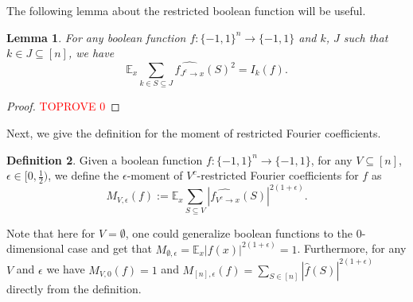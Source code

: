 \documentclass[10pt]{article} \usepackage[utf8]{inputenc}
\newtheorem{lem}{Lemma}[section]
\theoremstyle{definition}
\newtheorem{defn}[lem]{Definition}
\theoremstyle{remark}
\numberwithin{equation}{section}
\begin{document}
The following lemma about the restricted boolean function will be useful.
\begin{lem}
\label{L22}
For any boolean function $f:\{-1,1\}^n \to \{-1,1\}$ and $k$, $J$ such that $k\in J \subseteq [n]$, we have
\begin{equation}
\mathbb{E}_x \sum_{k\in S\subseteq J} \widehat{f_{J^c \to x}}(S)^2 =I_k(f).
\end{equation}
\end{lem}
\begin{proof}\textcolor{red}{TOPROVE 0}\end{proof}

Next, we give the definition for the moment of restricted Fourier coefficients.
\begin{defn}
Given a boolean function $f:\{-1,1\}^n\to \{-1,1\}$, for any $V \subseteq [n]$, $\epsilon \in [0, \frac{1}{2})$, we define the $\epsilon$-moment of $V^c$-restricted Fourier coefficients for $f$ as
\begin{equation}
M_{V,\epsilon}(f):=\mathbb{E}_{x}\sum_{S\subseteq V}{|\widehat{f_{V^{c} \to x}}(S)|^{2(1+\epsilon)}}.
\end{equation} 
\end{defn}
Note that here for $V=\emptyset$, one could generalize boolean functions to the 0-dimensional case and get that $M_{\emptyset, \epsilon}=\mathbb{E}_x |f(x)|^{2(1+\epsilon)}=1$. Furthermore, for any $V$ and $\epsilon$ we have $M_{V,0}(f)=1$ and $M_{[n],\epsilon}(f)=\sum\limits_{S\in[n]} |\hat{f}(S)|^{2(1+\epsilon)}$ directly from the definition. 
\end{document}

